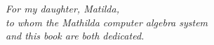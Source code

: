 \thispagestyle{empty}
\vspace*{0.3\textheight}
\begin{center}
{\Large\itshape
For my daughter, Matilda,\\[0.45em]
to whom the Mathilda computer algebra system\\[0.45em]
and this book are both dedicated.\par}
\end{center}
\vspace*{\fill}
\clearpage
